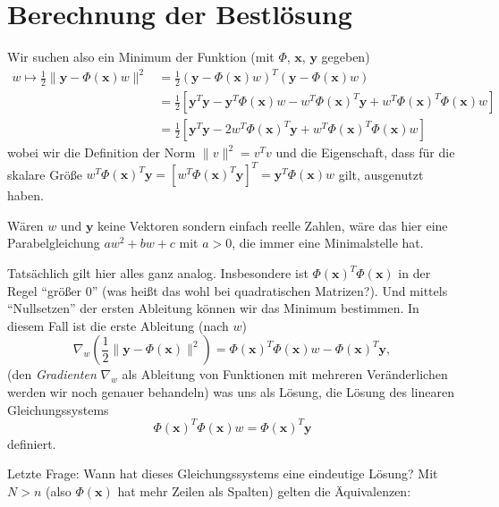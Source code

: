 \documentclass[]{book}
\theoremstyle{definition}
\theoremstyle{definition}
\theoremstyle{definition}
\theoremstyle{definition}
\theoremstyle{remark}
\begin{document}
\hypertarget{berechnung-der-bestluxf6sung}{%
\section{Berechnung der Bestlösung}\label{berechnung-der-bestluxf6sung}}

Wir suchen also ein Minimum der Funktion (mit \(\Phi\), \(\mathbf x\), \(\mathbf y\) gegeben)
\begin{equation*}
\begin{split}
w \mapsto \frac 12 \|\mathbf y - \Phi(\mathbf x)w \|^2 &= \frac 12 (\mathbf y - \Phi(\mathbf x)w)^T(\mathbf y - \Phi(\mathbf x)w)  \\ 
&= \frac 12 [\mathbf y^T\mathbf y - \mathbf y^T \Phi(\mathbf x)w - w^T \Phi(\mathbf x)^T\mathbf y  + w^T \Phi(\mathbf x)^T\Phi(\mathbf x)w] \\
&= \frac 12 [\mathbf y^T\mathbf y -2 w^T \Phi(\mathbf x)^T\mathbf y  + w^T \Phi(\mathbf x)^T\Phi(\mathbf x)w] 
\end{split}
\end{equation*}
wobei wir die Definition der Norm \(\|v\|^2 = v^Tv\) und die Eigenschaft, dass für die skalare Größe \(w^T \Phi(\mathbf x)^T\mathbf y = [w^T \Phi(\mathbf x)^T\mathbf y]^T = \mathbf y^T \Phi(\mathbf x)w\) gilt, ausgenutzt haben.

Wären \(w\) und \(\mathbf y\) keine Vektoren sondern einfach reelle Zahlen, wäre das hier eine Parabelgleichung \(aw^2 + bw + c\) mit \(a>0\), die immer eine Minimalstelle hat.

Tatsächlich gilt hier alles ganz analog. Insbesondere ist \(\Phi(\mathbf x)^T\Phi(\mathbf x)\) in der Regel ``größer 0'' (was heißt das wohl bei quadratischen Matrizen?). Und mittels ``Nullsetzen'' der ersten Ableitung können wir das Minimum bestimmen. In diesem Fall ist die erste Ableitung (nach \(w\))
\begin{equation*}
\nabla_w (\frac 12 \|\mathbf y - \Phi(\mathbf x) \|^2) = \Phi(\mathbf x)^T\Phi(\mathbf x)w - \Phi(\mathbf x)^T\mathbf y,
\end{equation*}
(den \emph{Gradienten} \(\nabla_w\) als Ableitung von Funktionen mit mehreren Veränderlichen werden wir noch genauer behandeln)
was uns als Lösung, die Lösung des linearen Gleichungssystems
\begin{equation*}
\Phi(\mathbf x)^T\Phi(\mathbf x)w = \Phi(\mathbf x)^T\mathbf y
\end{equation*}
definiert.

Letzte Frage: Wann hat dieses Gleichungssystems eine eindeutige Lösung? Mit \(N>n\) (also \(\Phi(\mathbf x)\) hat mehr Zeilen als Spalten) gelten die Äquivalenzen:
\end{document}
